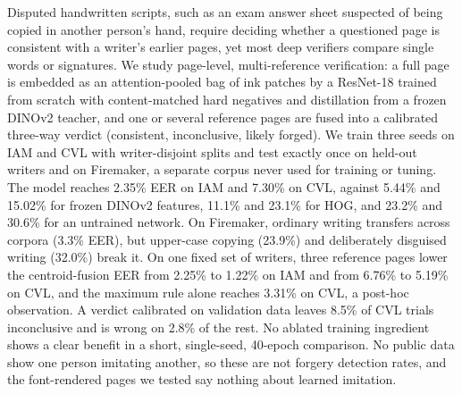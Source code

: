 Disputed handwritten scripts, such as an exam answer sheet suspected of being copied in another person's hand, require deciding whether a questioned page is consistent with a writer's earlier pages, yet most deep verifiers compare single words or signatures. We study page-level, multi-reference verification: a full page is embedded as an attention-pooled bag of ink patches by a ResNet-18 trained from scratch with content-matched hard negatives and distillation from a frozen DINOv2 teacher, and one or several reference pages are fused into a calibrated three-way verdict (consistent, inconclusive, likely forged). We train three seeds on IAM and CVL with writer-disjoint splits and test exactly once on held-out writers and on Firemaker, a separate corpus never used for training or tuning. The model reaches 2.35\% EER on IAM and 7.30\% on CVL, against 5.44\% and 15.02\% for frozen DINOv2 features, 11.1\% and 23.1\% for HOG, and 23.2\% and 30.6\% for an untrained network. On Firemaker, ordinary writing transfers across corpora (3.3\% EER), but upper-case copying (23.9\%) and deliberately disguised writing (32.0\%) break it. On one fixed set of writers, three reference pages lower the centroid-fusion EER from 2.25\% to 1.22\% on IAM and from 6.76\% to 5.19\% on CVL, and the maximum rule alone reaches 3.31\% on CVL, a post-hoc observation. A verdict calibrated on validation data leaves 8.5\% of CVL trials inconclusive and is wrong on 2.8\% of the rest. No ablated training ingredient shows a clear benefit in a short, single-seed, 40-epoch comparison. No public data show one person imitating another, so these are not forgery detection rates, and the font-rendered pages we tested say nothing about learned imitation.
